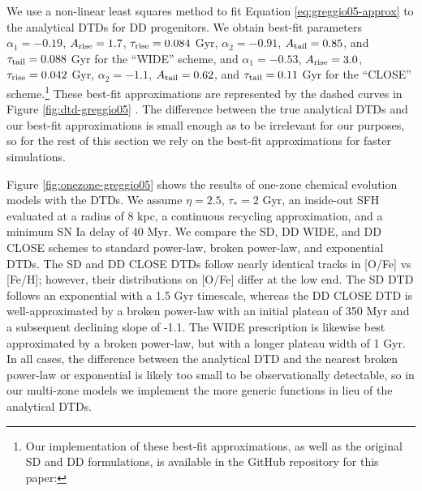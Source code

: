\documentclass[twocolumn,linenumbers,twocolappendix]{aastex631}
\begin{document}
\noindent We use a non-linear least squares method to fit Equation \ref{eq:greggio05-approx} to the analytical DTDs for DD progenitors. We obtain best-fit parameters $\alpha_1=-0.19$, $A_{\rm{rise}}=1.7$, $\tau_{\rm{rise}}=0.084$ Gyr, $\alpha_2=-0.91$, $A_{\rm{tail}}=0.85$, and $\tau_{\rm{tail}}=0.088$ Gyr for the ``WIDE'' scheme, and $\alpha_1=-0.53$, $A_{\rm{rise}}=3.0$, $\tau_{\rm{rise}}=0.042$ Gyr, $\alpha_2=-1.1$, $A_{\rm{tail}}=0.62$, and $\tau_{\rm{tail}}=0.11$ Gyr for the ``CLOSE'' scheme.\footnote{
Our implementation of these best-fit approximations, as well as the original SD and DD formulations, is available in the GitHub repository for this paper: \GitHubURL
} These best-fit approximations are represented by the dashed curves in Figure \ref{fig:dtd-greggio05} \citep[see also Figure 8 in][]{Greggio2005-AnalyticalRates}. The difference between the true analytical DTDs and our best-fit approximations is small enough as to be irrelevant for our purposes, so for the rest of this section we rely on the best-fit approximations for faster simulations.


Figure \ref{fig:onezone-greggio05} shows the results of one-zone chemical evolution models with the \citet{Greggio2005-AnalyticalRates} DTDs. We assume $\eta=2.5$, $\tau_*=2$ Gyr, an inside-out SFH evaluated at a radius of 8 kpc, a continuous recycling approximation, and a minimum SN Ia delay of 40 Myr. We compare the SD, DD WIDE, and DD CLOSE schemes to standard power-law, broken power-law, and exponential DTDs. The SD and DD CLOSE DTDs follow nearly identical tracks in [O/Fe] vs [Fe/H]; however, their distributions on [O/Fe] differ at the low end. The SD DTD follows an exponential with a 1.5 Gyr timescale, whereas the DD CLOSE DTD is well-approximated by a broken power-law with an initial plateau of 350 Myr and a subsequent declining slope of -1.1. The WIDE prescription is likewise best approximated by a broken power-law, but with a longer plateau width of 1 Gyr. In all cases, the difference between the analytical DTD and the nearest broken power-law or exponential is likely too small to be observationally detectable, so in our multi-zone models we implement the more generic functions in lieu of the analytical DTDs.
\end{document}
